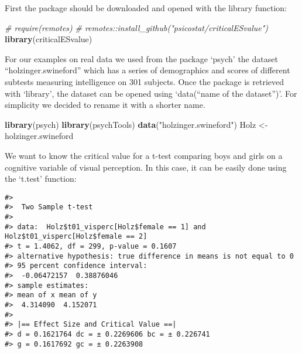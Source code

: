\documentclass[
  man]{apa7}
\newenvironment{Shaded}{\begin{snugshade}}{\end{snugshade}}
\newcommand{\AttributeTok}[1]{\textcolor[rgb]{0.13,0.29,0.53}{#1}}
\newcommand{\CommentTok}[1]{\textcolor[rgb]{0.56,0.35,0.01}{\textit{#1}}}
\newcommand{\DecValTok}[1]{\textcolor[rgb]{0.00,0.00,0.81}{#1}}
\newcommand{\FunctionTok}[1]{\textcolor[rgb]{0.13,0.29,0.53}{\textbf{#1}}}
\newcommand{\NormalTok}[1]{#1}
\newcommand{\OtherTok}[1]{\textcolor[rgb]{0.56,0.35,0.01}{#1}}
\newcommand{\SpecialCharTok}[1]{\textcolor[rgb]{0.81,0.36,0.00}{\textbf{#1}}}
\newcommand{\StringTok}[1]{\textcolor[rgb]{0.31,0.60,0.02}{#1}}
\begin{document}
First the package should be downloaded and opened with the library function:

\begin{Shaded}
\begin{Highlighting}[]
\CommentTok{\# require(remotes)}
\CommentTok{\# remotes::install\_github("psicostat/criticalESvalue")}
\FunctionTok{library}\NormalTok{(criticalESvalue)}
\end{Highlighting}
\end{Shaded}

For our examples on real data we used from the package `psych' the dataset ``holzinger.swineford'' which has a series of demographics and scores of different subtests measuring intelligence on 301 subjects. Once the package is retrieved with `library', the dataset can be opened using `data(``name of the dataset'')'. For simplicity we decided to rename it with a shorter name.

\begin{Shaded}
\begin{Highlighting}[]
\FunctionTok{library}\NormalTok{(psych)}
\FunctionTok{library}\NormalTok{(psychTools)}
\FunctionTok{data}\NormalTok{(}\StringTok{"holzinger.swineford"}\NormalTok{)}
\NormalTok{Holz }\OtherTok{\textless{}{-}}\NormalTok{ holzinger.swineford}
\end{Highlighting}
\end{Shaded}

We want to know the critical value for a t-test comparing boys and girls on a cognitive variable of visual perception. In this case, it can be easily done using the `t.test' function:

\begin{Shaded}
\end{Shaded}

\begin{verbatim}
#> 
#>  Two Sample t-test
#> 
#> data:  Holz$t01_visperc[Holz$female == 1] and Holz$t01_visperc[Holz$female == 2]
#> t = 1.4062, df = 299, p-value = 0.1607
#> alternative hypothesis: true difference in means is not equal to 0
#> 95 percent confidence interval:
#>  -0.06472157  0.38876046
#> sample estimates:
#> mean of x mean of y 
#>  4.314090  4.152071 
#> 
#> |== Effect Size and Critical Value ==| 
#> d = 0.1621764 dc = ± 0.2269606 bc = ± 0.226741 
#> g = 0.1617692 gc = ± 0.2263908
\end{verbatim}
\end{document}
